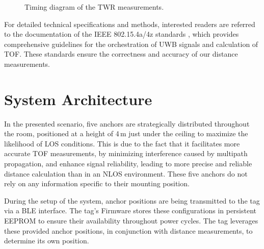 \documentclass[conference, a4paper]{IEEEtran}
\begin{document}
\begin{figure}[hbt!]
	\centering
	\caption{Timing diagram of the \ac{TWR} measurements.}
	\label{fig:csvbarchart}
\end{figure}

For detailed technical specifications and methods, interested readers are referred to the documentation of the IEEE 802.15.4a/4z standards \cite{IEEE802154a} \cite{IEEE802154z}, which provides comprehensive guidelines for the orchestration of \ac{UWB} signals and calculation of \ac{TOF}.
These standards ensure the correctness and accuracy of our distance measurements.

\section{System Architecture}\label{section:system_arch}
In the presented scenario, five anchors are strategically distributed throughout the room,
positioned at a height of 4\,m just under the ceiling to maximize the likelihood of 
\ac{LOS} conditions.
This is due to the fact that it facilitates more accurate \ac{TOF} measurements, by minimizing interference caused by multipath propagation, and enhance signal reliability,
leading to more precise and reliable distance calculation than in an \ac{NLOS} environment.
These five anchors do not rely on any information specific to their mounting position.

During the setup of the system, anchor positions are being transmitted to the tag via a \ac{BLE} interface.
The tag's Firmware stores these configurations in persistent \ac{EEPROM} to ensure their availability throughout power cycles.
The tag leverages these provided anchor positions, in conjunction with distance measurements, to determine its own position. 
\end{document}
